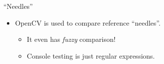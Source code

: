 \documentclass[10pt,aspectratio=169]{beamer}
\begin{document}
	\begin{frame}{``Needles''}
		\begin{itemize}
			\item OpenCV is used to compare reference ``needles''.
			\begin{itemize}
				\item It even has \textit{fuzzy} comparison!
				\item Console testing is just regular expressions.
			\end{itemize}
		\end{itemize}

		\begin{center}
		\end{center}
	\end{frame}
\end{document}
